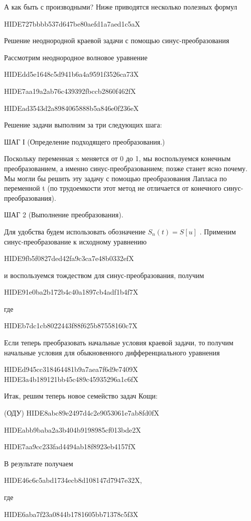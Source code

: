 \documentclass[
  ukrainian,
]{article}
\begin{document}
А как быть с производными? Ниже приводятся несколько полезных формул

HIDE727bbbb537d647be80aefd1a7aed1c5aX

Решение неоднородной краевой задачи с помощью синус-преобразования

Рассмотрим неоднородное волновое уравнение

HIDEdd5e1648c5d941b6a4a9591f3526ca73X

HIDE7aa19a2ab76c439392fbccb2860f462fX

HIDEad3543d2a8984065888b5a846e0f236eX

Решение задачи выполним за три следующих шага:

ШАГ І (Определение подходящего преобразования.)

Поскольку переменная x меняется от 0 до 1, мы воспользуемся конечным
преобразованием, а именно синус-преобразованием; позже станет ясно
почему. Мы могли бы решить эту задачу с помощью преобразования Лапласа
по переменной t (по трудоемкости этот метод не отличается от конечного
синус-преобразования).

ШАГ 2 (Выполнение преобразования).

Для удобства будем использовать обозначение \(S_n(t) = S[u]\) . Применим
синус-преобразование к исходному уравнению

HIDE9fb5f0827ded42fa9c3ca7e48b0332efX

и воспользуемся тождеством для синус-преобразования, получим

HIDE91e0ba2b172b4c40a1897cb4adf1b4f7X

где

HIDEb7dc1cb8022443f88f625b87558160c7X

Если теперь преобразовать начальные условия краевой задачи, то получим
начальные условия для обыкновенного дифференциального уравнения

HIDEd945cc318464481b9a7aea7f6d9e7409X
HIDE3a4b189121bb45c489c45935296a1c6fX

Итак, решим теперь новое семейство задач Кощи:

(ОДУ) HIDE8abc89e2497d4c2e9053061e7ab8fd0fX

HIDEabb9baba2a3b404b9198985cf013bde2X

HIDE7aa9cc233fad4494ab18f8923eb4157fX

В результате получаем

HIDE46c6c5abd1734ecb8d108147d7947e32X,

где

HIDE6aba7f23a0844b1781605bb71378c5f3X
\end{document}
